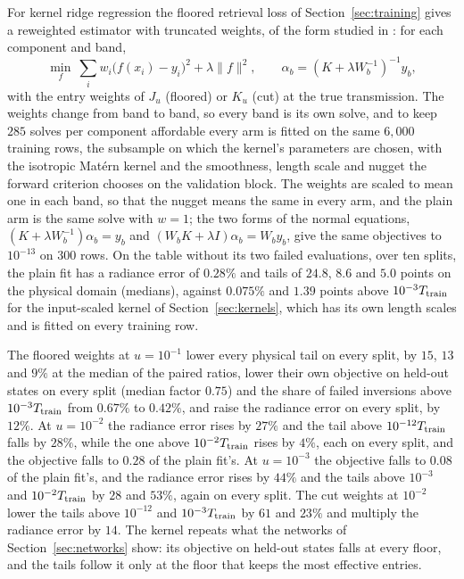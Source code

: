 \documentclass[11pt]{article}
\theoremstyle{remark}
\newcommand{\1}{\mathbf{1}}
\begin{document}
For kernel ridge regression the floored retrieval loss of Section~\ref{sec:training} gives a reweighted estimator with
truncated weights, of the form studied in \cite{mpw}: for each component and band,
\[
\min_f\ \sum_i w_i\bigl(f(x_i)-y_i\bigr)^2+\lambda\|f\|^2,\qquad \alpha_b=(K+\lambda W_b^{-1})^{-1}y_b ,
\]
with the entry weights of $J_u$ (floored) or $K_u$ (cut) at the true transmission. The weights change from band to band,
so every band is its own solve, and to keep $285$ solves per component affordable every arm is fitted on the same
$6{,}000$ training rows, the subsample on which the kernel's parameters are chosen, with the isotropic Mat\'ern kernel
and the smoothness, length scale and nugget the forward criterion chooses on the validation block. The weights are
scaled to mean one in each band, so that the nugget means the same in every arm, and the plain arm is the same solve
with $w=1$; the two forms of the normal equations, $(K+\lambda W_b^{-1})\alpha_b=y_b$ and
$(W_bK+\lambda I)\alpha_b=W_by_b$, give the same objectives to $10^{-13}$ on $300$ rows. On the table without its two
failed evaluations, over ten splits, the plain fit has a radiance error of $0.28\%$ and tails of $24.8$, $8.6$ and $5.0$
points on the physical domain (medians), against $0.075\%$ and $1.39$ points above $10^{-3}T_{\rm train}$ for the
input-scaled kernel of Section~\ref{sec:kernels}, which has its own length scales and is fitted on every training row.

The floored weights at $u=10^{-1}$ lower every physical tail on every split, by $15$, $13$ and $9\%$ at the median of
the paired ratios, lower their own objective on held-out states on every split (median factor $0.75$) and the share of
failed inversions above $10^{-3}T_{\rm train}$ from $0.67\%$ to $0.42\%$, and raise the radiance error on every split,
by $12\%$. At $u=10^{-2}$ the radiance error rises by $27\%$ and the tail above $10^{-12}T_{\rm train}$ falls by $28\%$,
while the one above $10^{-2}T_{\rm train}$ rises by $4\%$, each on every split, and the objective falls to $0.28$ of the
plain fit's. At $u=10^{-3}$ the objective falls to $0.08$ of the plain fit's, and the radiance error rises by $44\%$ and
the tails above $10^{-3}$ and $10^{-2}T_{\rm train}$ by $28$ and $53\%$, again on every split. The cut weights at
$10^{-2}$ lower the tails above $10^{-12}$ and $10^{-3}T_{\rm train}$ by $61$ and $23\%$ and multiply the radiance error
by $14$. The kernel repeats what the networks of Section~\ref{sec:networks} show: its objective on held-out states falls at
every floor, and the tails follow it only at the floor that keeps the most effective entries.
\end{document}
